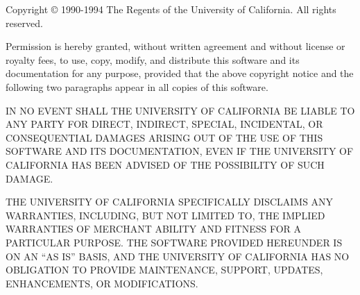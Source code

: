 Copyright \copyright{} 1990-1994 The Regents of the University of California.
All rights reserved.

Permission is hereby granted, without written agreement and without
license or royalty fees, to use, copy, modify, and distribute this
software and its documentation for any purpose, provided that the above
copyright notice and the following two paragraphs appear in all copies
of this software.

IN NO EVENT SHALL THE UNIVERSITY OF CALIFORNIA BE LIABLE TO ANY PARTY
FOR DIRECT, INDIRECT, SPECIAL, INCIDENTAL, OR CONSEQUENTIAL DAMAGES
ARISING OUT OF THE USE OF THIS SOFTWARE AND ITS DOCUMENTATION, EVEN IF
THE UNIVERSITY OF CALIFORNIA HAS BEEN ADVISED OF THE POSSIBILITY OF
SUCH DAMAGE.

THE UNIVERSITY OF CALIFORNIA SPECIFICALLY DISCLAIMS ANY WARRANTIES,
INCLUDING, BUT NOT LIMITED TO, THE IMPLIED WARRANTIES OF MERCHANT
ABILITY AND FITNESS FOR A PARTICULAR PURPOSE. THE SOFTWARE PROVIDED
HEREUNDER IS ON AN ``AS IS'' BASIS, AND THE UNIVERSITY OF CALIFORNIA
HAS NO OBLIGATION TO PROVIDE MAINTENANCE, SUPPORT, UPDATES,
ENHANCEMENTS, OR MODIFICATIONS.

